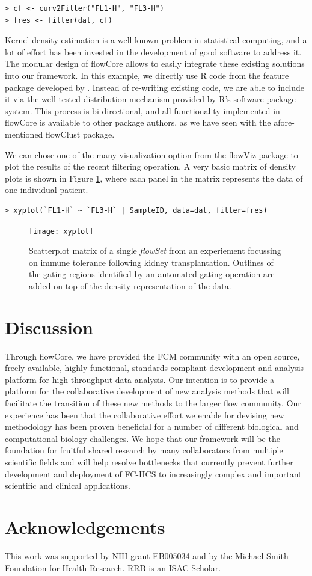 \documentclass[12pt]{article}
\newcommand{\Rpackage}[1]{{\textsf{#1}}}
\newcommand{\Rclass}[1]{{\textit{#1}}}
\begin{document}
\begin{verbatim}
> cf <- curv2Filter("FL1-H", "FL3-H")
> fres <- filter(dat, cf)
\end{verbatim}

Kernel density estimation is a well-known problem in statistical
computing, and a lot of effort has been invested in the development of
good software to address it. The modular design of \Rpackage{flowCore}
allows to easily integrate these existing solutions into our
framework. In this example, we directly use R code from the
\Rpackage{feature} package developed by \cite{wand2008}. Instead of
re-writing existing code, we are able to include it via the well
tested distribution mechanism provided by R's software package
system. This process is bi-directional, and all functionality
implemented in \Rpackage{flowCore} is available to other package
authors, as we have seen with the afore-mentioned \Rpackage{flowClust}
package.

We can chose one of the many visualization option from the flowViz
package to plot the results of the recent filtering operation. A very
basic matrix of density plots is shown in Figure \ref{xyplot}, where
each panel in the matrix represents the data of one individual
patient.

\begin{verbatim}
> xyplot(`FL1-H` ~ `FL3-H` | SampleID, data=dat, filter=fres)
\end{verbatim}


\begin{figure}[htbp]
\centering
\texttt{[image: xyplot]}
\caption{\label{xyplot}%
  Scatterplot matrix of a single \Rclass{flowSet} from an experiement
  focussing on immune tolerance following kidney
  transplantation. Outlines of the gating regions identified by an
  automated gating operation are added on top of the density
  representation of the data.}
\end{figure}



\section*{Discussion}

Through \Rpackage{flowCore}, we have provided the FCM community with
an open source, freely available, highly functional, standards
compliant development and analysis platform for high throughput data
analysis.  Our intention is to provide a platform for the
collaborative development of new analysis methods that will facilitate
the transition of these new methods to the larger flow community.  Our
experience has been that the collaborative effort we enable for
devising new methodology has been proven beneficial for a number of
different biological and computational biology challenges.  We hope
that our framework will be the foundation for fruitful shared research
by many collaborators from multiple scientific fields and will help
resolve bottlenecks that currently prevent further development and
deployment of FC-HCS to increasingly complex and important scientific
and clinical applications.

\section*{Acknowledgements}
This work was supported by NIH grant EB005034 and by the Michael Smith
Foundation for Health Research. RRB is an ISAC Scholar.

  
 
\end{document}
